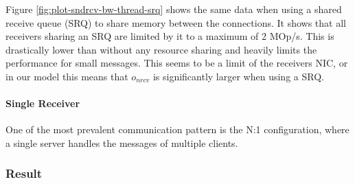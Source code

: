 Figure \ref{fig:plot-sndrcv-bw-thread-srq} shows the same data when using a shared receive queue (SRQ) to share memory
between the connections. It shows that all receivers sharing an SRQ are limited by it to a maximum of 2 MOp/s. This is 
drastically lower than without any resource sharing and heavily limits the performance for small messages. This seems
to be a limit of the receivers NIC, or in our model this means that $o_{nrcv}$ is significantly larger when using a 
SRQ. 


\paragraph{Single Receiver}

One of the most prevalent communication pattern is the N:1 configuration, where a single server handles the messages
of multiple clients.

\subsubsection{Result}


